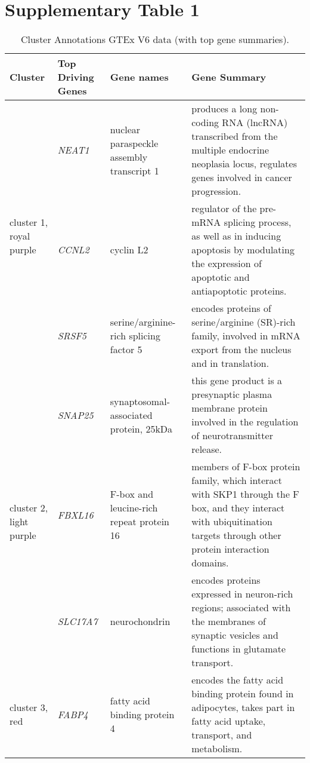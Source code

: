 \section{Supplementary Table 1}
\begin{table}[htp]
\caption{Cluster Annotations GTEx V6 data (with top gene summaries). \label{tab:supptab1}} 
\begin{center}
\begin{tabular}{|p{0.6in}|p{0.6in}|p{1.3 in}|p{3.8in}|}
\hline
Cluster & Top Driving \qquad Genes & Gene names  & Gene Summary \\
\hline
\multirow{3}{4em}{\scriptsize{cluster 1, royal purple} } &  \small{\textit{NEAT1}} & \scriptsize{nuclear paraspeckle assembly transcript 1} & \scriptsize{produces a long non-coding RNA (lncRNA) transcribed from the multiple endocrine neoplasia locus, regulates genes involved in cancer progression.}\\ 
				& \small{\textit{CCNL2}} & \scriptsize{cyclin L2} & \scriptsize{regulator of the pre-mRNA splicing process, as well as in inducing apoptosis by modulating the expression of apoptotic and antiapoptotic proteins.}\\
				& \small{\textit{SRSF5}} & \scriptsize{serine/arginine-rich splicing factor 5} & \scriptsize{encodes proteins of serine/arginine (SR)-rich family,  involved in mRNA export from the nucleus and in translation.}\\
\hline
 \multirow{3}{4em}{\scriptsize{cluster 2, light purple} } & \small{\textit{SNAP25}}  & \scriptsize{synaptosomal-associated protein, 25kDa} & \scriptsize{this gene product is a presynaptic plasma membrane protein involved in the regulation of neurotransmitter release.} \\
 					&  \small{\textit{FBXL16}}  & \scriptsize{F-box and leucine-rich repeat protein 16} & \scriptsize{members of F-box protein family, which interact with SKP1 through the F box, and they interact with ubiquitination targets through other protein interaction domains.} \\
					&  \small{\textit{SLC17A7}}  & \scriptsize{neurochondrin} & \scriptsize{encodes proteins expressed in neuron-rich regions; associated with the membranes of synaptic vesicles and functions in glutamate transport.} \\
\hline
 \multirow{3}{4em}{\scriptsize{cluster 3, red} } & \small{\textit{FABP4}}  & \scriptsize{fatty acid binding protein 4} & \scriptsize{ encodes the fatty acid binding protein found in adipocytes, takes part in fatty acid uptake, transport, and metabolism.} \\

\end{tabular}
\end{center}
\end{table}

